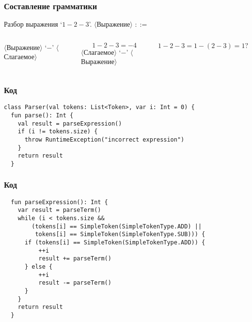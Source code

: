 \documentclass[pdf,russian]{beamer}
\begin{document}
\begin{frame}
    \frametitle{Составление грамматики}
    Разбор выражения `$1-2-3$'.
    \center
    $\langle$Выражение$\rangle$ $::=$
    \begin{columns}
        \center
        $\langle$Выражение$\rangle$ `$-$' $\langle$Слагаемое$\rangle$
        \hspace{2cm}
        \[
            1-2-3=-4
        \]
        \center
        $\langle$Слагаемое$\rangle$ `$-$' $\langle$Выражение$\rangle$
        \hspace{2cm}
        \[
            1-2-3=1-(2-3)=1?
        \]
    \end{columns}
\end{frame}

\begin{frame}[fragile]
    \frametitle{Код}
    \pause
    \begin{verbatim}
class Parser(val tokens: List<Token>, var i: Int = 0) {
  fun parse(): Int {
    val result = parseExpression()
    if (i != tokens.size) {
      throw RuntimeException("incorrect expression")
    }
    return result
  }
    \end{verbatim}
\end{frame}

\begin{frame}[fragile]
    \frametitle{Код}
    \begin{verbatim}
  fun parseExpression(): Int {
    var result = parseTerm()
    while (i < tokens.size &&
        (tokens[i] == SimpleToken(SimpleTokenType.ADD) ||
         tokens[i] == SimpleToken(SimpleTokenType.SUB))) {
      if (tokens[i] == SimpleToken(SimpleTokenType.ADD)) {
          ++i
          result += parseTerm()
      } else {
          ++i
          result -= parseTerm()
      }
    }
    return result
  }
    \end{verbatim}
\end{frame}
\end{document}
